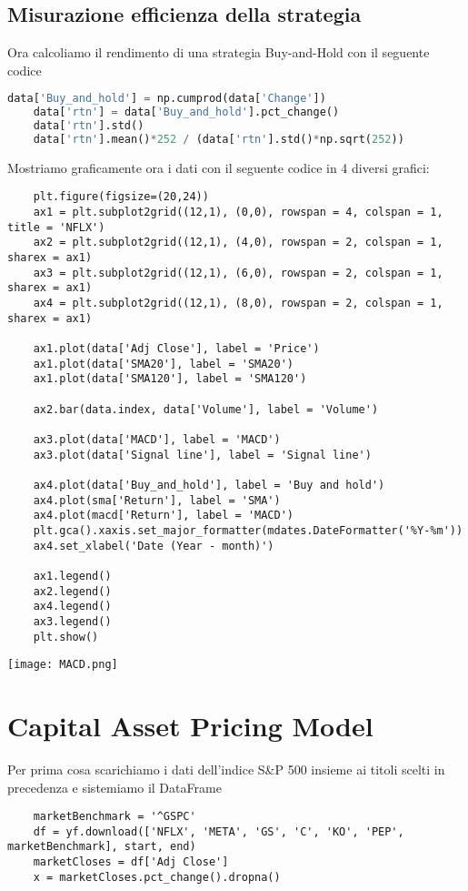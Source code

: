\documentclass{report}
\begin{document}
\section{Misurazione efficienza della strategia}
Ora calcoliamo il rendimento di una strategia Buy-and-Hold con il seguente codice
\begin{lstlisting}[language=python]
    data['Buy_and_hold'] = np.cumprod(data['Change'])
    data['rtn'] = data['Buy_and_hold'].pct_change()
    data['rtn'].std()
    data['rtn'].mean()*252 / (data['rtn'].std()*np.sqrt(252))
\end{lstlisting}
Mostriamo graficamente ora i dati con il seguente codice in 4 diversi grafici:
\begin{lstlisting}
    plt.figure(figsize=(20,24))
    ax1 = plt.subplot2grid((12,1), (0,0), rowspan = 4, colspan = 1, title = 'NFLX')
    ax2 = plt.subplot2grid((12,1), (4,0), rowspan = 2, colspan = 1, sharex = ax1)
    ax3 = plt.subplot2grid((12,1), (6,0), rowspan = 2, colspan = 1, sharex = ax1)
    ax4 = plt.subplot2grid((12,1), (8,0), rowspan = 2, colspan = 1, sharex = ax1)
    
    ax1.plot(data['Adj Close'], label = 'Price')
    ax1.plot(data['SMA20'], label = 'SMA20')
    ax1.plot(data['SMA120'], label = 'SMA120')
    
    ax2.bar(data.index, data['Volume'], label = 'Volume')
    
    ax3.plot(data['MACD'], label = 'MACD')
    ax3.plot(data['Signal line'], label = 'Signal line')
    
    ax4.plot(data['Buy_and_hold'], label = 'Buy and hold')
    ax4.plot(sma['Return'], label = 'SMA')
    ax4.plot(macd['Return'], label = 'MACD')
    plt.gca().xaxis.set_major_formatter(mdates.DateFormatter('%Y-%m'))
    ax4.set_xlabel('Date (Year - month)')
    
    ax1.legend()
    ax2.legend()
    ax4.legend()
    ax3.legend()
    plt.show()
\end{lstlisting}

\texttt{[image: MACD.png]}

\chapter{Capital Asset Pricing Model}
Per prima cosa scarichiamo i dati dell'indice S&P 500 insieme ai titoli scelti in precedenza e sistemiamo il DataFrame
\begin{lstlisting}
    marketBenchmark = '^GSPC'
    df = yf.download(['NFLX', 'META', 'GS', 'C', 'KO', 'PEP', marketBenchmark], start, end)
    marketCloses = df['Adj Close']
    x = marketCloses.pct_change().dropna()
\end{lstlisting}
\end{document}
